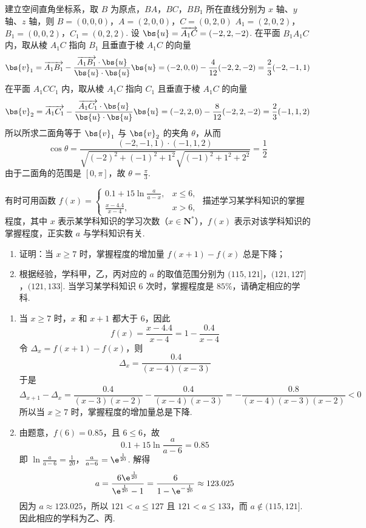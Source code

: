 \begin{solution}
建立空间直角坐标系，取 \(B\) 为原点，\(BA\)，\(BC\)，\(BB_1\) 所在直线分别为 \(x\) 轴、\(y\) 轴、\(z\) 轴，则
\(B=(0,0,0)\)，\(A=(2,0,0)\)，\(C=(0,2,0)\)
\(A_1=(2,0,2)\)，\(B_1=(0,0,2)\)，\(C_1=(0,2,2)\).
设 \(\bs{u}=\overrightarrow{A_1C}=(-2,2,-2)\). 在平面 \(B_1A_1C\) 内，取从棱 \(A_1C\) 指向 \(B_1\) 且垂直于棱 \(A_1C\) 的向量
\[
\bs{v}_1=\overrightarrow{A_1B_1}-\frac{\overrightarrow{A_1B_1}\cdot\bs{u}}{\bs{u}\cdot\bs{u}}\bs{u}=(-2,0,0)-\frac{4}{12}(-2,2,-2)=\frac{2}{3}(-2,-1,1)
\]
在平面 \(A_1CC_1\) 内，取从棱 \(A_1C\) 指向 \(C_1\) 且垂直于棱 \(A_1C\) 的向量
\[
\bs{v}_2=\overrightarrow{A_1C_1}-\frac{\overrightarrow{A_1C_1}\cdot\bs{u}}{\bs{u}\cdot\bs{u}}\bs{u}=(-2,2,0)-\frac{8}{12}(-2,2,-2)=\frac{2}{3}(-1,1,2)
\]
所以所求二面角等于 \(\bs{v}_1\) 与 \(\bs{v}_2\) 的夹角 \(\theta\)，从而
\[
\cos\theta=\frac{(-2,-1,1)\cdot(-1,1,2)}{\sqrt{(-2)^2+(-1)^2+1^2}\sqrt{(-1)^2+1^2+2^2}}=\frac{1}{2}
\]
由于二面角的范围是 \([0,\pi]\)，故 \(\theta=\frac{\pi}{3}\).
\end{solution}

\begin{problem}
有时可用函数 \(f(x) = \begin{cases}
0.1 + 15 \ln \frac{a}{a - x}, & x \leqslant 6,\\
\frac{x - 4.4}{x - 4}, & x > 6,
\end{cases}\) 描述学习某学科知识的掌握程度，其中 \(x\) 表示某学科知识的学习次数（\(x \in \mathbf{N}^*\)），\(f(x)\) 表示对该学科知识的掌握程度，正实数 \(a\) 与学科知识有关.

\begin{enumerate}
\item 证明：当 \(x \geqslant 7\) 时，掌握程度的增加量 \(f(x + 1) - f(x)\) 总是下降；

\item 根据经验，学科甲，乙，丙对应的 \(a\) 的取值范围分别为 \((115, 121]\)，\((121, 127]\)，\((121, 133]\). 当学习某学科知识 \(6\) 次时，掌握程度是 \(85\%\)，请确定相应的学科.
\end{enumerate}
\end{problem}

\begin{solution}
\begin{enumerate}
\item 当 \(x\geqslant 7\) 时，\(x\) 和 \(x+1\) 都大于 \(6\)，因此
\[
f(x)=\frac{x-4.4}{x-4}=1-\frac{0.4}{x-4}
\]
令 \(\Delta_x=f(x+1)-f(x)\)，则
\[
\Delta_x=\frac{0.4}{(x-4)(x-3)}
\]
于是
\[
\Delta_{x+1}-\Delta_x=\frac{0.4}{(x-3)(x-2)}-\frac{0.4}{(x-4)(x-3)}=-\frac{0.8}{(x-4)(x-3)(x-2)}<0
\]
所以当 \(x\geqslant 7\) 时，掌握程度的增加量总是下降.

\item 由题意，\(f(6)=0.85\)，且 \(6\leqslant 6\)，故
\[
0.1+15\ln\frac{a}{a-6}=0.85
\]
即
\(\ln\frac{a}{a-6}=\frac{1}{20}\)，\(\frac{a}{a-6}=\e^{\frac{1}{20}}\).
解得
\[
a=\frac{6\e^{\frac{1}{20}}}{\e^{\frac{1}{20}}-1}=\frac{6}{1-\e^{-\frac{1}{20}}}\approx123.025
\]
因为 \(a\approx123.025\)，所以 \(121<a\leqslant127\) 且 \(121<a\leqslant133\)，而 \(a\notin(115,121]\). 因此相应的学科为乙、丙.
\end{enumerate}
\end{solution}

